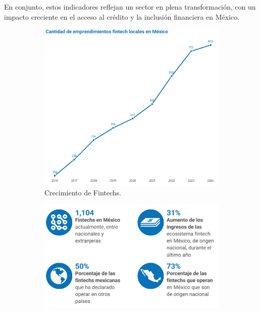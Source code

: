 En conjunto, estos indicadores reflejan un sector en plena transformación, con un impacto creciente en el acceso al crédito y la inclusión financiera en México.

\begin{figure}[h!]
    \centering
    \begin{subfigure}[b]{0.45\textwidth} %
        \centering
        \includegraphics[scale=0.5]{Figuras/crecimientofintec.png} %
        \caption{Crecimiento de Fintechs.}
        \label{fig:crecfintechs}
    \end{subfigure}
    \hspace{0.005\textwidth} %
    \begin{subfigure}[b]{0.45\textwidth} %
        \centering
        \includegraphics[scale=0.5]{Figuras/datosmercado.png} %

\end{subfigure}
\end{figure}
